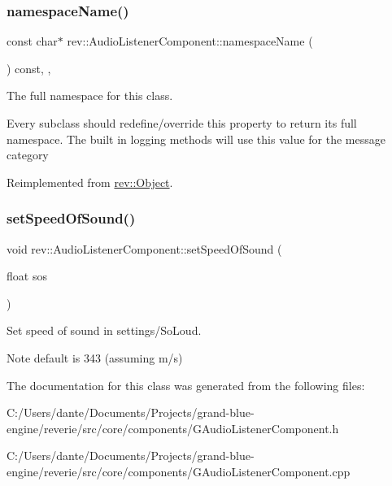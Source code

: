 \mbox{\label{classrev_1_1_audio_listener_component_a465f4278108070ac4027d15a0efea0ea}} 
\subsubsection{\texorpdfstring{namespaceName()}{namespaceName()}}
{\footnotesize\ttfamily const char$\ast$ rev\+::\+Audio\+Listener\+Component\+::namespace\+Name (\begin{DoxyParamCaption}{ }\end{DoxyParamCaption}) const\hspace{0.3cm}{\ttfamily [inline]}, {\ttfamily [override]}, {\ttfamily [virtual]}}



The full namespace for this class. 

Every subclass should redefine/override this property to return its full namespace. The built in logging methods will use this value for the message category 

Reimplemented from \mbox{\hyperlink{classrev_1_1_object_aaeb638d3e10f361c56c211a318a27f3d}{rev\+::\+Object}}.

\mbox{\label{classrev_1_1_audio_listener_component_a8a47dd43d295e34e3e5e93597afe546f}} 
\subsubsection{\texorpdfstring{setSpeedOfSound()}{setSpeedOfSound()}}
{\footnotesize\ttfamily void rev\+::\+Audio\+Listener\+Component\+::set\+Speed\+Of\+Sound (\begin{DoxyParamCaption}\item[{float}]{sos }\end{DoxyParamCaption})}



Set speed of sound in settings/\+So\+Loud. 

\begin{DoxyNote}{Note}
default is 343 (assuming m/s) 
\end{DoxyNote}


The documentation for this class was generated from the following files\+:\begin{DoxyCompactItemize}
\item 
C\+:/\+Users/dante/\+Documents/\+Projects/grand-\/blue-\/engine/reverie/src/core/components/G\+Audio\+Listener\+Component.\+h\item 
C\+:/\+Users/dante/\+Documents/\+Projects/grand-\/blue-\/engine/reverie/src/core/components/G\+Audio\+Listener\+Component.\+cpp\end{DoxyCompactItemize}
